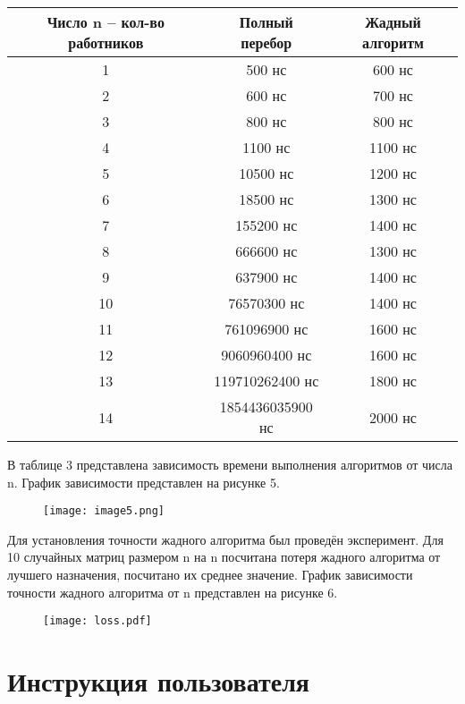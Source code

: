 \documentclass[]{article}
\begin{document}
\begin{table}[h]
    \centering
    \begin{tabular}{|c|c|c|}
    \hline
    Число n – кол-во работников & Полный перебор & Жадный алгоритм \\ \hline
    1 & 500 нс & 600 нс \\ \hline
    2 & 600 нс & 700 нс \\ \hline
    3 & 800 нс & 800 нс \\ \hline
    4 & 1100 нс & 1100 нс \\ \hline
    5 & 10500 нс & 1200 нс \\ \hline
    6 & 18500 нс & 1300 нс \\ \hline
    7 & 155200 нс & 1400 нс \\ \hline
    8 & 666600 нс & 1300 нс \\ \hline
    9 & 637900 нс & 1400 нс \\ \hline
    10 & 76570300 нс & 1400 нс \\ \hline
    11 & 761096900 нс & 1600 нс \\ \hline
    12 & 9060960400 нс & 1600 нс \\ \hline
    13 & 119710262400 нс & 1800 нс \\ \hline
    14 & 1854436035900 нс & 2000 нс \\ \hline
    \end{tabular}
    \caption{}
    \label{tab:comparison}
\end{table}
\newpage
В таблице 3 представлена зависимость времени выполнения алгоритмов от
числа n. График зависимости представлен на рисунке 5.

\begin{figure}
    \centering
    \texttt{[image: image5.png]}
    \caption{}
    \label{fig:enter-label}
\end{figure}
\newpage


Для установления точности жадного алгоритма был проведён эксперимент. Для 10 случайных матриц размером n на n посчитана потеря жадного алгоритма от лучшего назначения, посчитано их среднее значение. График зависимости точности жадного алгоритма от n представлен на рисунке 6.
\begin{figure}
    \centering
    \texttt{[image: loss.pdf]}
    \caption{}
    \label{fig:enter-label}
\end{figure}
\newpage
\hypertarget{Инструкция}{%
\section{Инструкция
пользователя}\label{Инструкция}}
\end{document}
